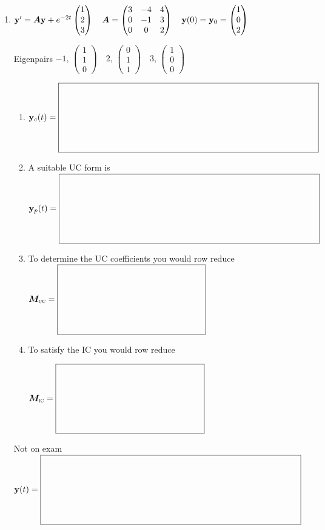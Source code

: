 \documentclass[12pt,letterpaper]{article}
\newcommand{\mat}[1]{\bm{#1}}
\newcommand{\SystemBlank}[2]{%
  \vcenter{\hbox{$\boxed{\rule{0pt}{#2}\makebox[#1]{}}$}}}
\newcommand{\VectorBlank}{\SystemBlank{4.16in}{1.04in}}
\newcommand{\MatrixBlank}{\SystemBlank{2.34in}{1.04in}}
\begin{document}
\noindent{}%
\begin{enumerate}
\item
\begingroup\setlength{\arraycolsep}{3pt}
$\vect{y}'=\mat{A}\vect{y}+e^{-2t}\begin{pmatrix}1\\2\\3\end{pmatrix}\quad \mat{A}=\begin{pmatrix}3&-4&4\\0&-1&3\\0&0&2\end{pmatrix}\quad \vect{y}(0)=\vect{y}_0=\begin{pmatrix}1\\0\\2\end{pmatrix}$
\par Eigenpairs $-1,\,\begin{pmatrix}1\\1\\0\end{pmatrix}\quad 2,\,\begin{pmatrix}0\\1\\1\end{pmatrix}\quad 3,\,\begin{pmatrix}1\\0\\0\end{pmatrix}$
\endgroup
\begin{enumerate}
\item 
$\vect{y}_c(t)=\VectorBlank$
\item A suitable UC form is
\newline
$\vect{y}_p(t)=\VectorBlank$
\item To determine the UC coefficients 
you would row reduce \newline
$\mat{M}_{\text{\textsc{uc}}}=\MatrixBlank$
\item To satisfy the IC you would row reduce
\par\noindent $\mat{M}_{\text{\textsc{ic}}}=\MatrixBlank$\par
\end{enumerate}
\vfill
Not on exam  $\vect{y}(t)=\VectorBlank$


\end{enumerate}
\end{document}
